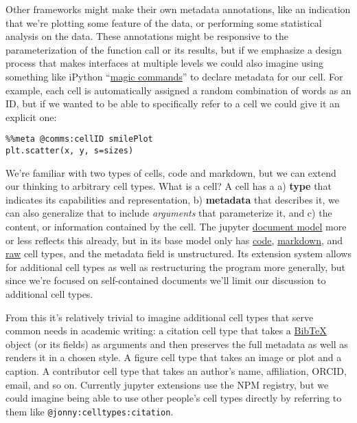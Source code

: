 Other frameworks might make their own metadata annotations, like an
indication that we're plotting some feature of the data, or performing
some statistical analysis on the data. These annotations might be
responsive to the parameterization of the function call or its results,
but if we emphasize a design process that makes interfaces at multiple
levels we could also imagine using something like iPython
``\href{https://ipython.readthedocs.io/en/stable/interactive/magics.html}{magic
commands}'' to declare metadata for our cell. For example, each cell is
automatically assigned a random combination of words as an ID, but if we
wanted to be able to specifically refer to a cell we could give it an
explicit one:

\begin{verbatim}
%%meta @comms:cellID smilePlot
plt.scatter(x, y, s=sizes)
\end{verbatim}

We're familiar with two types of cells, code and markdown, but we can
extend our thinking to arbitrary cell types. What is a cell? A cell has
a a) \textbf{type} that indicates its capabilities and representation,
b) \textbf{metadata} that describes it, we can also generalize that to
include \emph{arguments} that parameterize it, and c) the content, or
information contained by the cell. The jupyter
\href{https://jupyterlab.readthedocs.io/en/stable/api/classes/cells.cellmodel-1.html}{document
model} more or less reflects this already, but in its base model only
has
\href{https://jupyterlab.readthedocs.io/en/stable/api/classes/cells.codecellmodel-1.html}{code},
\href{https://jupyterlab.readthedocs.io/en/stable/api/classes/cells.markdowncellmodel.html}{markdown},
and
\href{https://jupyterlab.readthedocs.io/en/stable/api/classes/cells.rawcellmodel.html}{raw}
cell types, and the metadata field is unstructured. Its extension system
allows for additional cell types as well as restructuring the program
more generally, but since we're focused on self-contained documents
we'll limit our discussion to additional cell types.

From this it's relatively trivial to imagine additional cell types that
serve common needs in academic writing: a citation cell type that takes
a \href{http://www.bibtex.org/Format/}{BibTeX} object (or its fields) as
arguments and then preserves the full metadata as well as renders it in
a chosen style. A figure cell type that takes an image or plot and a
caption. A contributor cell type that takes an author's name,
affiliation, ORCID, email, and so on. Currently jupyter extensions use
the NPM registry, but we could imagine being able to use other people's
cell types directly by referring to them like
\texttt{@jonny:celltypes:citation}.

